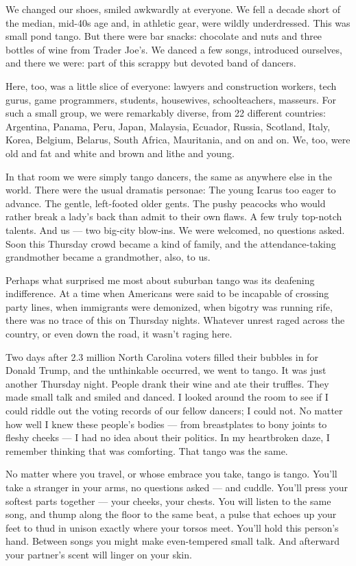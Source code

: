 We changed our shoes, smiled awkwardly at everyone. We fell a decade
short of the median, mid-40s age and, in athletic gear, were wildly
underdressed. This was small pond tango. But there were bar snacks:
chocolate and nuts and three bottles of wine from Trader Joe's. We
danced a few songs, introduced ourselves, and there we were: part of
this scrappy but devoted band of dancers.

Here, too, was a little slice of everyone: lawyers and construction
workers, tech gurus, game programmers, students, housewives,
schoolteachers, masseurs. For such a small group, we were remarkably
diverse, from 22 different countries: Argentina, Panama, Peru, Japan,
Malaysia, Ecuador, Russia, Scotland, Italy, Korea, Belgium, Belarus,
South Africa, Mauritania, and on and on. We, too, were old and fat and
white and brown and lithe and young.

In that room we were simply tango dancers, the same as anywhere else in
the world. There were the usual dramatis personae: The young Icarus too
eager to advance. The gentle, left-footed older gents. The pushy
peacocks who would rather break a lady's back than admit to their own
flaws. A few truly top-notch talents. And us --- two big-city blow-ins.
We were welcomed, no questions asked. Soon this Thursday crowd became a
kind of family, and the attendance-taking grandmother became a
grandmother, also, to us.

Perhaps what surprised me most about suburban tango was its deafening
indifference. At a time when Americans were said to be incapable of
crossing party lines, when immigrants were demonized, when bigotry was
running rife, there was no trace of this on Thursday nights. Whatever
unrest raged across the country, or even down the road, it wasn't raging
here.

Two days after 2.3 million North Carolina voters filled their bubbles in
for Donald Trump, and the unthinkable occurred, we went to tango. It was
just another Thursday night. People drank their wine and ate their
truffles. They made small talk and smiled and danced. I looked around
the room to see if I could riddle out the voting records of our fellow
dancers; I could not. No matter how well I knew these people's bodies
--- from breastplates to bony joints to fleshy cheeks --- I had no idea
about their politics. In my heartbroken daze, I remember thinking that
was comforting. That tango was the same.

No matter where you travel, or whose embrace you take, tango is tango.
You'll take a stranger in your arms, no questions asked --- and cuddle.
You'll press your softest parts together --- your cheeks, your chests.
You will listen to the same song, and thump along the floor to the same
beat, a pulse that echoes up your feet to thud in unison exactly where
your torsos meet. You'll hold this person's hand. Between songs you
might make even-tempered small talk. And afterward your partner's scent
will linger on your skin.

